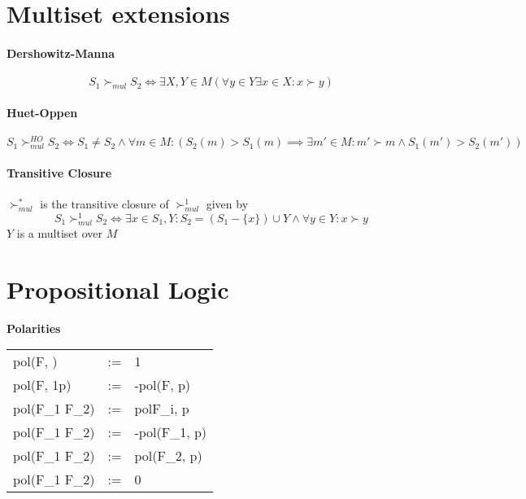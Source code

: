 \documentclass{article}
\newcommand{\mulsucc}{\succ_{mul}} %
\newcommand{\set}[1]{\{#1\}} %
\newcommand{\defi}{:=} %
\newcommand{\subfrepl}[2]{[#1]_{#2}} %
\newcommand{\pol}[1]{pol(#1)} %
\begin{document}
\section{Multiset extensions}
\paragraph{Dershowitz-Manna}
\[
S_1 \mulsucc S_2 \iff \exists X, Y \in M (\forall y \in Y \exists x \in X: x \succ y)
\]
\paragraph{Huet-Oppen}
\[
S_1 \mulsucc^{HO} S_2 \iff S_1 \neq S_2 \land \forall m \in M: (S_2(m) > S_1(m) \implies \exists m' \in M: m' \succ m \land S_1(m') > S_2(m'))
\]
\paragraph{Transitive Closure}
$\mulsucc^*$ is the transitive closure of $\mulsucc^1$ given by
\[
S_1 \mulsucc^1 S_2 \iff \exists x \in S_1, Y: S_2 = (S_1 - \set{x}) \cup Y \land \forall y \in Y: x \succ y
\]
$Y$ is a multiset over $M$

\section{Propositional Logic}
\begin{minipage}{\linewidth}
  \bf Polarities
  \begin{tabular}{L C L}
    \pol{F, \epsilon} & \defi & 1\\
    \pol{\neg F, 1p} & \defi & -\pol{F, p}\\
    \pol{F_1 \circ F_2} & \defi & pol{F_i, p}\\
    \pol{F_1 \implies F_2} & \defi & -\pol{F_1, p}\\
    \pol{F_1 \implies F_2} & \defi & \pol{F_2, p}\\
    \pol{F_1 \iff F_2} & \defi & 0\\
  \end{tabular}
\end{minipage}

\end{document}
